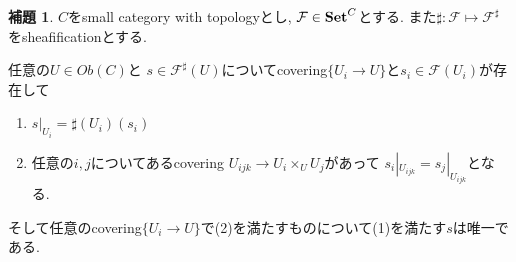 \documentclass[dvipdfmx,a4paper,11pt]{report}
\theoremstyle{definition}
\newtheorem{lem}[thm]{補題}
\begin{document}
  \begin{tcolorbox}
 [colback = white, colframe = green!35!black, fonttitle = \bfseries,breakable = true]
 \begin{lem}\cite[00WK Lemma 10.15]{Sta}
 \label{lem-stacks-sheafification}
 $C$をsmall category with topologyとし, $\mathcal{F} \in {\bf Set}^{C}$とする.
 また$\sharp : \mathcal{F} \mapsto \mathcal{F}^{\sharp}$をsheafificationとする.
  
 任意の$U \in Ob(C)$と
  $s \in \mathcal{F}^{\sharp}(U)$についてcovering$\{ U_i \to U\}$と$s_i \in \mathcal{F}(U_i)$が存在して
  \begin{enumerate}
  \item $s|_{U_i} = \sharp(U_i)(s_i)$
  \item 任意の$i,j$についてあるcovering
  $U_{ijk} \to U_{i} \times_{U} U_j$があって
  $s_{i}|_{U_{ijk}} = s_{j}|_{U_{ijk}}$となる. 
  \end{enumerate}
そして任意のcovering$\{ U_i \to U\}$で(2)を満たすものについて(1)を満たす$s$は唯一である. 
 \end{lem}
 \end{tcolorbox}
\end{document}
